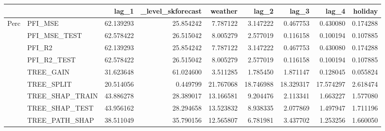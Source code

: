 \begin{tabular}{llrrrrrrr}
\toprule
 &  & lag_1 & _level_skforecast & weather & lag_2 & lag_3 & lag_4 & holiday \\
\midrule
\multirow[t]{9}{*}{Perc} & PFI_MSE & 62.139293 & 25.854242 & 7.787122 & 3.147222 & 0.467753 & 0.430080 & 0.174288 \\
 & PFI_MSE_TEST & 62.578422 & 26.515042 & 8.005279 & 2.577019 & 0.116158 & 0.100194 & 0.107885 \\
 & PFI_R2 & 62.139293 & 25.854242 & 7.787122 & 3.147222 & 0.467753 & 0.430080 & 0.174288 \\
 & PFI_R2_TEST & 62.578422 & 26.515042 & 8.005279 & 2.577019 & 0.116158 & 0.100194 & 0.107885 \\
 & TREE_GAIN & 31.623648 & 61.024600 & 3.511285 & 1.785450 & 1.871147 & 0.128045 & 0.055824 \\
 & TREE_SPLIT & 20.514056 & 0.449799 & 21.767068 & 18.746988 & 18.329317 & 17.574297 & 2.618474 \\
 & TREE_SHAP_TRAIN & 43.886278 & 28.389017 & 13.166581 & 9.204476 & 2.113341 & 1.663227 & 1.577080 \\
 & TREE_SHAP_TEST & 43.956162 & 28.294658 & 13.523832 & 8.938335 & 2.077869 & 1.497947 & 1.711196 \\
 & TREE_PATH_SHAP & 38.511049 & 35.790156 & 12.565807 & 6.781981 & 3.437702 & 1.253256 & 1.660050 \\
\cline{1-9}
\bottomrule
\end{tabular}

